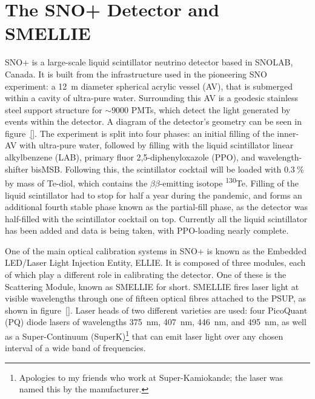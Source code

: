 \section{The SNO+ Detector and SMELLIE}\label{sect:detector}
SNO+ is a large-scale liquid scintillator neutrino detector based in SNOLAB, Canada. It is built from the infrastructure used in the pioneering SNO experiment: a \SI{12}{\metre} diameter spherical acrylic vessel (AV), that is submerged within a cavity of ultra-pure water. Surrounding this AV is a geodesic stainless steel support structure for $\sim\num{9000}$ PMTs, which detect the light generated by events within the detector. A diagram of the detector's geometry can be seen in figure~\ref{}. The experiment is split into four phases: an initial filling of the inner-AV with ultra-pure water, followed by filling with the liquid scintillator linear alkylbenzene (LAB), primary fluor 2,5-diphenyloxazole (PPO), and wavelength-shifter bisMSB. Following this, the scintillator cocktail will be loaded with $\SI{0.3}{\percent}$ by mass of Te-diol, which contains the $\beta\beta$-emitting isotope \textsuperscript{130}Te. Filling of the liquid scintillator had to stop for half a year during the pandemic, and forms an additional fourth stable phase known as the partial-fill phase, as the detector was half-filled with the scintillator cocktail on top. Currently all the liquid scintillator has been added and data is being taken, with PPO-loading nearly complete.

One of the main optical calibration systems in SNO+ is known as the Embedded LED/Laser Light Injection Entity, ELLIE. It is composed of three modules, each of which play a different role in calibrating the detector. One of these is the Scattering Module, known as SMELLIE for short. SMELLIE fires laser light at visible wavelengths through one of fifteen optical fibres attached to the PSUP, as shown in figure~\ref{}. Laser heads of two different varieties are used: four PicoQuant (PQ) diode lasers of wavelengths \SI{375}{\nano\metre}, \SI{407}{\nano\metre}, \SI{446}{\nano\metre}, and \SI{495}{\nano\metre}, as well as a Super-Continuum (SuperK)\footnote{Apologies to my friends who work at Super-Kamiokande; the laser was named this by the manufacturer.} that can emit laser light over any chosen interval of a wide band of frequencies.